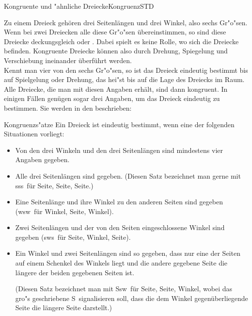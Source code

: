 \begin{MXContent}{Kongruente und "ahnliche Dreiecke}{Kongruenz}{STD}

Zu einem Dreieck geh\"oren drei Seitenl\"angen und drei Winkel, also sechs 
Gr"o"sen. Wenn bei zwei Dreiecken alle diese Gr"o"sen \"ubereinstimmen, so 
sind diese Dreiecke deckungsgleich oder . 
Dabei spielt es keine 
Rolle, wo sich die Dreiecke befinden. Kongruente Dreiecke k\"onnen also durch 
Drehung, Spiegelung und Verschiebung ineinander \"uberf\"uhrt werden.\\
Kennt man vier von den sechs Gr"o"sen, so ist das Dreieck eindeutig bestimmt 
bis auf Spielgelung oder Drehung, das hei"st bis auf die Lage des Dreiecks 
im Raum. Alle Dreiecke, die man mit diesen Angaben erh\"alt, sind dann kongruent.
In einigen F\"allen gen\"ugen sogar drei Angaben, um das Dreieck eindeutig 
zu bestimmen.
Sie werden in den  
beschrieben:

\begin{MXInfo}{Kongruenzs"atze}%
Ein Dreieck ist eindeutig bestimmt, wenn eine der folgenden Situationen vorliegt:
\begin{itemize}
 \item Von den drei Winkeln und den drei Seitenl\"angen sind
       mindestens vier Angaben gegeben.
 
 \item Alle drei Seitenl\"angen sind gegeben.
       (Diesen Satz bezeichnet man gerne mit \glqq sss\grqq\ f\"ur \glqq Seite, Seite, Seite\grqq.)
 
 \item Eine Seitenl\"ange und ihre Winkel zu den anderen Seiten sind gegeben
       (\glqq wsw\grqq\ f\"ur \glqq Winkel, Seite, Winkel\grqq).
        
 \item Zwei Seitenl\"angen und der von den Seiten eingeschlossene Winkel 
       sind gegeben (\glqq sws\grqq\ f\"ur \glqq Seite, Winkel, Seite\grqq).
       
             
 \item Ein Winkel und zwei Seitenl\"angen sind so gegeben, dass nur eine der 
       Seiten auf einem Schenkel des Winkels liegt und die andere gegebene 
       Seite die l\"angere der beiden gegebenen Seiten ist.

       (Diesen Satz bezeichnet man mit \glqq Ssw\grqq\ f\"ur \glqq Seite, Seite,
        Winkel\grqq,
        wobei das gro"s geschriebene \glqq S\grqq\ signalisieren soll, dass die
        dem Winkel gegen\"uberliegende Seite die l\"angere Seite darstellt.)
\end{itemize}
\end{MXInfo}
 

\end{MXContent}
